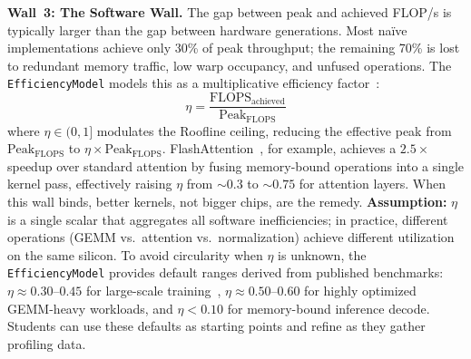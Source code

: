 \documentclass[10pt,twocolumn]{article}
\begin{document}
\textbf{Wall~3: The Software Wall.} The gap between peak and achieved FLOP/s is typically larger than the gap between hardware generations. Most na\"ive implementations achieve only 30\% of peak throughput; the remaining 70\% is lost to redundant memory traffic, low warp occupancy, and unfused operations. The \texttt{EfficiencyModel} models this as a multiplicative efficiency factor~\citep{chowdhery2022palm}:
\begin{equation}
\label{eq:efficiency}
\eta = \frac{\text{FLOPS}_{\text{achieved}}}{\text{Peak}_{\text{FLOPS}}}
\end{equation}
where $\eta \in (0,1]$ modulates the Roofline ceiling, reducing the effective peak from $\text{Peak}_{\text{FLOPS}}$ to $\eta \times \text{Peak}_{\text{FLOPS}}$. FlashAttention~\citep{dao2022}, for example, achieves a $2.5\times$ speedup over standard attention by fusing memory-bound operations into a single kernel pass, effectively raising $\eta$ from ${\sim}0.3$ to ${\sim}0.75$ for attention layers. When this wall binds, better kernels, not bigger chips, are the remedy. \textbf{Assumption:} $\eta$ is a single scalar that aggregates all software inefficiencies; in practice, different operations (GEMM vs.\ attention vs.\ normalization) achieve different utilization on the same silicon. To avoid circularity when $\eta$ is unknown, the \texttt{EfficiencyModel} provides default ranges derived from published benchmarks: $\eta \approx 0.30$--$0.45$ for large-scale training~\citep{chowdhery2022palm,llama3team2024}, $\eta \approx 0.50$--$0.60$ for highly optimized GEMM-heavy workloads, and $\eta < 0.10$ for memory-bound inference decode. Students can use these defaults as starting points and refine as they gather profiling data.
\end{document}
